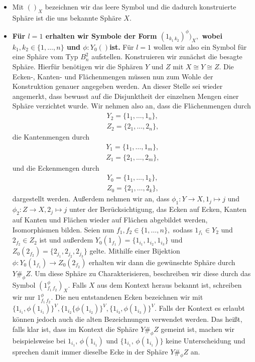 \documentclass[12pt,titlepage,twoside,cleardoublepage]{article}
\theoremstyle{nummermitklammern}
\numberwithin{equation}{section}
\begin{document}
\begin{itemize}
\item Mit $()_X$ bezeichnen wir das leere Symbol und die dadurch konstruierte Sphäre ist die uns bekannte Sphäre $X.$
\item \textbf{Für $l=1$ erhalten wir Symbole der Form $(1_{k_1\,k_2})^\phi)_X,$ wobei $k_1,k_2\in \{1,\ldots,n\}$ und $\phi:Y_0()$ist.}
Für $l=1$ wollen wir also ein Symbol für eine Sphäre vom Typ $B_n^2$ aufstellen.
 Konstruieren wir zunächst die besagte Sphäre. Hierfür benötigen wir die Sphären $Y$ und $Z$ mit $X\cong Y\cong Z.$ 
Die Ecken-, Kanten- und Flächenmengen müssen nun zum Wohle der Konstruktion genauer angegeben werden.
An dieser Stelle sei wieder angemerkt, dass bewusst auf die Disjunktheit der einzelnen Mengen einer Sphäre verzichtet wurde.
Wir nehmen also an, dass die Flächenmengen durch
\begin{align*}
Y_2=\{1_1,\ldots,1_n\},\\ 
Z_2=\{2_1,\ldots,2_n\},
\end{align*}
die Kantenmengen durch
\begin{align*}
Y_1=\{1_1,\ldots,1_m\}, \\
Z_1=\{2_1,\ldots,2_m\},
\end{align*}
und die Eckenmengen durch 
\begin{align*}
Y_0=\{1_1,\ldots,1_k\}, \\
Z_0=\{2_1,\ldots,2_k\},
\end{align*}
dargestellt werden. 
Außerdem nehmen wir an, dass $\phi_1:Y\to X,1_j \mapsto j$ und $\phi_2:Z\to X,2_j \mapsto j$ unter der Berücksichtigung, das Ecken auf Ecken, Kanten auf Kanten und Flächen wieder auf Flächen abgebildet werden, Isomorphismen bilden.
Seien nun $f_1,f_2\in \{1,\ldots,n\},$ sodass $1_{f_1}\in Y_2$ und $2_{f_2}\in Z_2$ ist und außerdem $Y_0(1_{f_1})=\{1_{i_1},1_{i_2},1_{i_3}\}$ und $Z_0(2_{f_2})=\{2_{j_1},2_{j_2},2_{j_3}\}$ gelte.
 Mithilfe einer Bijektion $\phi:Y_0(1_{f_1})\to Z_0(2_{f_2})$ erhalten wir dann die gewünschte Sphäre durch $Y\#_{\phi}Z.$ Um diese Sphäre zu Charakterisieren, beschreiben wir diese durch das Symbol $(1_{f_1\, f_2}^\phi)_X.$ Falls $X$ aus dem Kontext heraus bekannt ist, schreiben wir nur $1_{f_1\, f_2}^\phi.$ Die neu entstandenen Ecken bezeichnen wir mit $\{1_{i_1},\phi(1_{i_1})\}^V,\{1_{i_2}\{\phi(1_{i_2})\}^V,\{1_{i_3},\phi(1_{i_3})\}^V.$ Falls der Kontext es erlaubt können jedoch auch die alten Bezeichnungen verwendet werden. Das heißt, falls klar ist, dass im Kontext die Sphäre $Y\#_{\phi}Z$ gemeint ist, machen wir beispielsweise bei $1_{i_1},\,\phi(1_{i_1})$ und $\{1_{i_1},\,\phi(1_{i_1})\}$ keine Unterscheidung und sprechen damit immer dieselbe Ecke in der Sphäre $Y\#_{\phi}Z$ an.  

\end{itemize}
\end{document}
